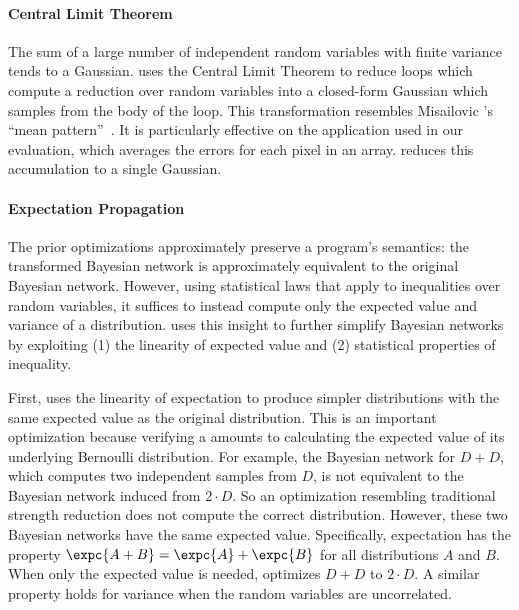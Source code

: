 \paragraph{Central Limit Theorem} The sum of a large number of
independent random variables with
finite variance tends to a Gaussian.  \tool uses the Central Limit
Theorem to reduce loops which compute a reduction over random
variables into a closed-form Gaussian which samples from the body of
the loop.  This transformation resembles
Misailovic \etal's ``mean pattern''~\cite{sasa-sas11}. It is particularly
effective on the 
 application used in our evaluation, which averages the errors for each pixel in an
array. \tool reduces this accumulation to a single Gaussian.

\paragraph{Expectation Propagation}
\label{passert:sec:expectation}

The prior optimizations approximately preserve a program's semantics: 
the transformed Bayesian network is approximately equivalent to the original
Bayesian network.
However, using statistical laws that apply to inequalities over random
variables, it suffices to instead compute only the expected value and variance
of a distribution.
\tool uses this insight to
further simplify Bayesian networks by exploiting (1) the linearity of
expected value and (2) statistical properties of inequality.

First, \tool uses the linearity of expectation to produce simpler
distributions with the same expected value as the original
distribution. This is an important optimization because verifying a \passert
amounts to calculating the expected value of its underlying Bernoulli
distribution. 
For example, the Bayesian network for
$D + D$, which computes two independent samples from $D$,
is not equivalent to the Bayesian network induced from $2 \cdot
D$. So an optimization resembling traditional strength reduction does
not compute the correct distribution.
However, these two Bayesian networks have the same expected
value. Specifically, expectation has the property $\expc{A + B} =
\expc{A} + \expc{B}$ for all distributions $A$ and $B$.
When only the expected value is needed, \tool optimizes $D + D$ to $2 \cdot
D$.
A similar property holds for variance when the random variables are
uncorrelated.

